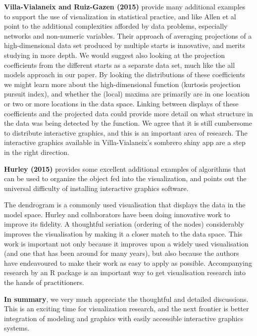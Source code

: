 \documentclass[preprint]{imsart}
\begin{document}
\textbf{Villa-Vialaneix and Ruiz-Gazen (2015)} provide many additional examples to support the use of visualization in statistical practice, and like Allen et al point to the additional complexities afforded by data problems, especially networks and non-numeric variables. Their approach of averaging projections of a high-dimensional data set produced by multiple starts is innovative, and merits studying in more depth. We would suggest also looking at the projection coefficients from the different starts as a separate data set, much like the all models approach in our paper. By looking the distributions of these coefficients we might learn more about the high-dimensional function (kurtosis projection pursuit index), and whether the (local) maxima are primarily are in one location or two or more locations in the data space. Linking between displays of these coefficients and the projected data could provide more detail on what structure in the data was being detected by the function. We agree that it is still cumbersome to distribute interactive graphics, and this is an important area of research. The interactive graphics available in Villa-Vialaneix's sombrero shiny app are a step in the right direction.


\textbf{Hurley (2015)} provides some excellent additional examples of algorithms that can be used to organize the object fed into the visualization, and points out the universal difficulty of installing interactive graphics software.

The dendrogram is a commonly used visualisation that displays the data in the model space. Hurley and collaborators have been doing innovative work to improve its fidelity. A thoughtful seriation (ordering of the nodes) considerably improves the visualisation by making it a closer match to the data space. This work is important not only because it improves upon a widely used visualisation (and one that has been around for many years), but also because the authors have endeavoured to make their work as easy to apply as possible. Accompanying research by an R package is an important way to get visualisation research into the hands of practitioners.


\textbf{In summary}, we very much appreciate the thoughtful and detailed discussions. This is an exciting time for visualization research, and the next frontier is better integration of modeling and graphics with easily accessible interactive graphics systems.
\end{document}
